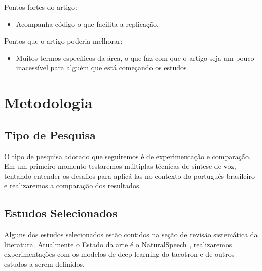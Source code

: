 \documentclass[a4paper,12pt]{article}
\begin{document}

			Pontos fortes do artigo:
			
			\begin{itemize}
				\item Acompanha código o que facilita a replicação.
			\end{itemize}
			Pontos que o artigo poderia melhorar:
			\begin{itemize}
				\item Muitos termos específicos da área, o que faz com que o artigo seja um pouco inacessível para alguém que está começando os estudos.
			\end{itemize}
			
	\section{Metodologia}
		\subsection{Tipo de Pesquisa}
		O tipo de pesquisa adotado que seguiremos é de experimentação e comparação. Em um primeiro momento testaremos múltiplas técnicas de síntese de voz, tentando entender os desafios para aplicá-las no contexto do português brasileiro e realizaremos a comparação dos resultados.
		
		\subsection{Estudos Selecionados}
		Alguns dos estudos selecionados estão contidos na seção de revisão sistemática da literatura. Atualmente o Estado da arte é o NaturalSpeech \cite{tan2022naturalspeech}, realizaremos experimentações com os modelos de deep learning do tacotron \cite{wang2017tacotron} e de outros estudos a serem definidos.
		
\end{document}
